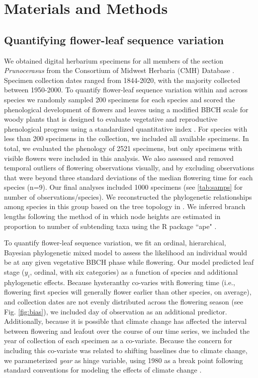 \documentclass{article}[12pt]
\begin{document}
\section*{Materials and Methods}
\subsection*{Quantifying flower-leaf sequence variation}  

We obtained digital herbarium specimens for all members of the section \textit{Prunocerasus} from the Consortium of Midwest Herbaria (CMH) Database \citep{CMH}. Specimen collection dates ranged from 1844-2020, with the majority collected between 1950-2000. To quantify flower-leaf sequence variation within and across species we randomly sampled 200 specimens for each species and scored the phenological development of flowers and leaves using a modified BBCH scale for woody plants that is designed to evaluate vegetative and reproductive phenological progress using a standardized quantitative index \citep{Finn2007}. For species with less than 200 specimens in the collection, we included all available specimens. In total, we evaluated the phenology of 2521 specimens, but only specimens with visible flowers were included in this analysis. We also assessed and removed  temporal outliers of flowering observations visually, and by excluding observations that were beyond three standard deviations of the median flowering time for each species (n=9). Our final analyses included 1000 specimens (see \ref{tab:samps} for number of observations/species). We reconstructed the phylogenetic relationships among species in this group based on the tree topology in \citet{Shaw:2004aa}. We inferred branch lengths following the method of \citet{Granfen1989} in which node heights are estimated in proportion to number of subtending taxa using the R package ``ape" \citep{Paradis2019}.

To quantify flower-leaf sequence variation, we fit an ordinal, hierarchical, Bayesian phylogenetic mixed model \citep{Garamszegi2014} to assess the likelihood an individual would be at any given vegetative BBCH phase while flowering. Our model predicted leaf stage ($y_i$, ordinal, with six categories) as a function of species and additional phylogenetic effects. Because hysteranthy co-varies with flowering time (i.e., flowering first species will generally flower earlier than other species, on average), and collection dates are not evenly distributed across the flowering season (see Fig. \ref{fig:bias}), we included day of observation as an additional predictor. Additionally, because it is possible that climate change has affected the interval between flowering and leafout over the course of our time series, we included the year of collection of each specimen as a co-variate. Because the concern for including this co-variate was related to shifting baselines due to climate change, we parameterized \emph{year} as hinge variable, using 1980 as a break point following standard conventions for modeling the effects of climate change \citep{IPCC2013,Buonaiuto2020,Kharouba2018}.
\end{document}
